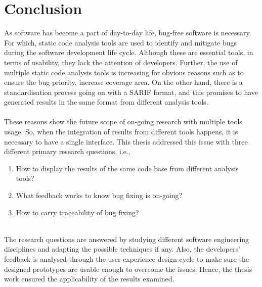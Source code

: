 \chapter{Conclusion}
\label{ch:conclusion_report}

As software has become a part of day-to-day life, bug-free software is necessary. For which, static code analysis tools are used to identify and mitigate bugs during the software development life cycle. Although these are essential tools, in terms of usability, they lack the attention of developers. Further, the use of multiple static code analysis tools is increasing for obvious reasons such as to ensure the bug priority, increase coverage area. On the other hand, there is a standardisation process going on with a SARIF format, \cite{sarif-git} and this promises to have generated results in the same format from different analysis tools. \\ \\

These reasons show the future scope of on-going research with multiple tools usage. So, when the integration of results from different tools happens, it is necessary to have a single interface. This thesis addressed this issue with three different primary research questions, i.e., \\ 

\begin{enumerate}
\item  How to display the results of the same code base from different analysis tools?
\item  What feedback works to know bug fixing is on-going?
\item  How to carry traceability of bug fixing? \\ \\
\end{enumerate}

The research questions are answered by studying different software engineering disciplines and adapting the possible techniques if any. Also, the developers’ feedback is analysed through the user experience design cycle to make sure the designed prototypes are usable enough to overcome the issues. Hence, the thesis work ensured the applicability of the results examined. \\ \\

